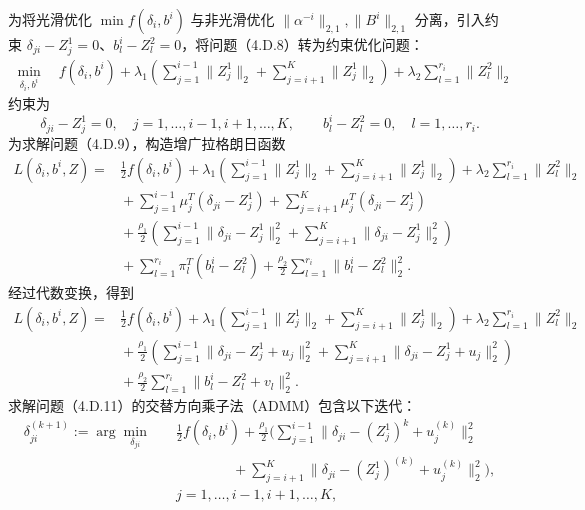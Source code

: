 为将光滑优化 $\min f(\delta_i,b^i)$ 与非光滑优化 $\|\alpha^{-i}\|_{2,1},\|B^i\|_{2,1}$ 分离，引入约束 $\delta_{ji}-Z_j^1=0$、$b_l^i-Z_l^2=0$，将问题（4.D.8）转为约束优化问题：
\begin{equation}
\begin{aligned}
\min_{\delta_i,b^i}\quad f(\delta_i,b^i)
+\lambda_1\left(\sum_{j=1}^{i-1}\|Z_j^1\|_2
+\sum_{j=i+1}^{K}\|Z_j^1\|_2\right)
+\lambda_2\sum_{l=1}^{r_i}\|Z_l^2\|_2
\end{aligned}\tag{4.D.9}
\end{equation}
约束为
\[
\delta_{ji}-Z_j^1=0,\quad j=1,\ldots,i-1,i+1,\ldots,K,
\qquad b_l^i-Z_l^2=0,\quad l=1,\ldots,r_i.
\]
为求解问题（4.D.9），构造增广拉格朗日函数
\begin{equation}
\begin{aligned}
L(\delta_i,b^i,Z)={}&\frac12f(\delta_i,b^i)
+\lambda_1\left(\sum_{j=1}^{i-1}\|Z_j^1\|_2+\sum_{j=i+1}^{K}\|Z_j^1\|_2\right)
+\lambda_2\sum_{l=1}^{r_i}\|Z_l^2\|_2\\
&{}+\sum_{j=1}^{i-1}\mu_j^T(\delta_{ji}-Z_j^1)
+\sum_{j=i+1}^{K}\mu_j^T(\delta_{ji}-Z_j^1)\\
&{}+\frac{\rho_1}{2}\left(\sum_{j=1}^{i-1}\|\delta_{ji}-Z_j^1\|_2^2
+\sum_{j=i+1}^{K}\|\delta_{ji}-Z_j^1\|_2^2\right)\\
&{}+\sum_{l=1}^{r_i}\pi_l^T(b_l^i-Z_l^2)
+\frac{\rho_2}{2}\sum_{l=1}^{r_i}\|b_l^i-Z_l^2\|_2^2.
\end{aligned}\tag{4.D.10}
\end{equation}
经过代数变换，得到
\begin{equation}
\begin{aligned}
L(\delta_i,b^i,Z)={}&\frac12f(\delta_i,b^i)
+\lambda_1\left(\sum_{j=1}^{i-1}\|Z_j^1\|_2+\sum_{j=i+1}^{K}\|Z_j^1\|_2\right)
+\lambda_2\sum_{l=1}^{r_i}\|Z_l^2\|_2\\
&{}+\frac{\rho_1}{2}\left(\sum_{j=1}^{i-1}\|\delta_{ji}-Z_j^1+u_j\|_2^2
+\sum_{j=i+1}^{K}\|\delta_{ji}-Z_j^1+u_j\|_2^2\right)\\
&{}+\frac{\rho_2}{2}\sum_{l=1}^{r_i}\|b_l^i-Z_l^2+v_l\|_2^2.
\end{aligned}\tag{4.D.11}
\end{equation}
求解问题（4.D.11）的交替方向乘子法（ADMM）包含以下迭代：
\begin{equation}
\begin{aligned}
\delta_{ji}^{(k+1)}:=\arg\min_{\delta_{ji}}\quad
&\frac12f(\delta_i,b^i)
+\frac{\rho_1}{2}\biggl(
\sum_{j=1}^{i-1}\|\delta_{ji}-(Z_j^1)^k+u_j^{(k)}\|_2^2\\
&\hspace{4em}{}+\sum_{j=i+1}^{K}\|\delta_{ji}-(Z_j^1)^{(k)}+u_j^{(k)}\|_2^2\biggr),\\
&j=1,\ldots,i-1,i+1,\ldots,K,
\end{aligned}\tag{4.D.12}
\end{equation}

